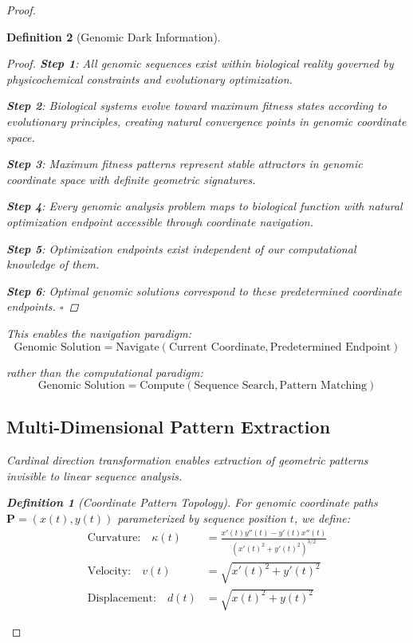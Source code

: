\documentclass[12pt,a4paper]{article}
\newtheorem{definition}{Definition}
\begin{document}
\begin{proof}
\begin{definition}[Genomic Dark Information]
\begin{algorithm}[H]
\begin{proof}
\textbf{Step 1}: All genomic sequences exist within biological reality governed by physicochemical constraints and evolutionary optimization.

\textbf{Step 2}: Biological systems evolve toward maximum fitness states according to evolutionary principles, creating natural convergence points in genomic coordinate space.

\textbf{Step 3}: Maximum fitness patterns represent stable attractors in genomic coordinate space with definite geometric signatures.

\textbf{Step 4}: Every genomic analysis problem maps to biological function with natural optimization endpoint accessible through coordinate navigation.

\textbf{Step 5}: Optimization endpoints exist independent of our computational knowledge of them.

\textbf{Step 6}: Optimal genomic solutions correspond to these predetermined coordinate endpoints. $\square$
\end{proof}

This enables the navigation paradigm:
\begin{equation}
\text{Genomic Solution} = \text{Navigate}(\text{Current Coordinate}, \text{Predetermined Endpoint})
\end{equation}

rather than the computational paradigm:
\begin{equation}
\text{Genomic Solution} = \text{Compute}(\text{Sequence Search}, \text{Pattern Matching})
\end{equation}

\subsection{Multi-Dimensional Pattern Extraction}

Cardinal direction transformation enables extraction of geometric patterns invisible to linear sequence analysis.

\begin{definition}[Coordinate Pattern Topology]
For genomic coordinate paths $\mathbf{P} = (x(t), y(t))$ parameterized by sequence position $t$, we define:
\begin{align}
\text{Curvature:} \quad \kappa(t) &= \frac{x'(t)y''(t) - y'(t)x''(t)}{(x'(t)^2 + y'(t)^2)^{3/2}} \\
\text{Velocity:} \quad v(t) &= \sqrt{x'(t)^2 + y'(t)^2} \\
\text{Displacement:} \quad d(t) &= \sqrt{x(t)^2 + y(t)^2}
\end{align}
\end{definition}


\end{algorithm}
\end{definition}
\end{proof}
\end{document}

